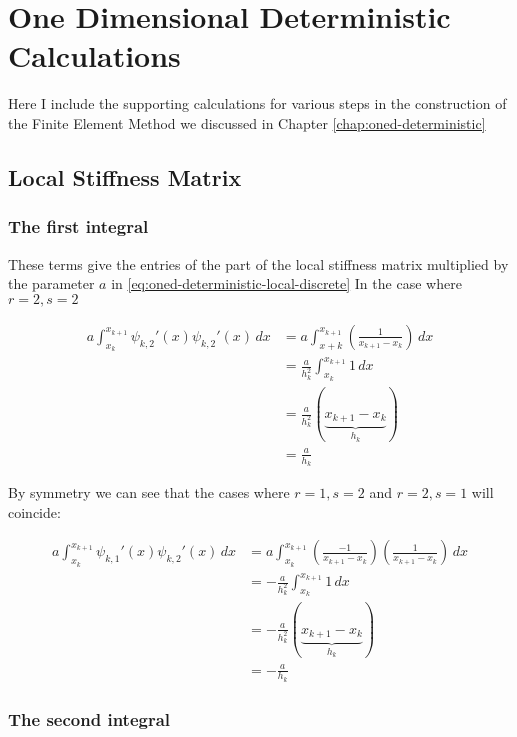 \chapter{One Dimensional Deterministic Calculations}

Here I include the supporting calculations for various steps in the construction of the
Finite Element Method we discussed in Chapter \ref{chap:oned-deterministic}

\section{Local Stiffness Matrix}

\subsection{The first integral}

These terms give the entries of the part of the local stiffness matrix multiplied 
by the parameter $a$ in \ref{eq:oned-deterministic-local-discrete}
In the case where $r = 2, s = 2$

\begin{align*}
  a\int_{x_k}^{x_{k+1}}\psi_{k,2}'(x)\psi_{k,2}'(x)\, dx 
    &= a\int_{x+k}^{x_{k+1}}\left(\frac{1}{x_{k+1} - x_k}\right)\, dx \\
    &= \frac{a}{h_k^2}\int_{x_k}^{x_{k+1}}1\, dx \\
    &= \frac{a}{h_k^2}(\underbrace{x_{k+1} - x_k}_{h_k}) \\
    &= \frac{a}{h_k}
\end{align*}

By symmetry we can see that the cases where $r = 1, s = 2$ and $r = 2, s = 1$ will
coincide:

\begin{align*}
	a\int_{x_k}^{x_{k+1}}\psi_{k, 1}'(x)\psi_{k, 2}'(x)\, dx
      &= a\int_{x_k}^{x_{k+1}}\left(\frac{-1}{x_{k+1} - x_k}\right)
                              \left(\frac{1}{x_{k+1} - x_k}\right)\, dx \\
      &= -\frac{a}{h_k^2}\int_{x_k}^{x_{k+1}}1\, dx \\
      &= -\frac{a}{h_k^2}(\underbrace{x_{k+1} - x_k}_{h_k}) \\
      &= -\frac{a}{h_k}
\end{align*}

\subsection{The second integral}

